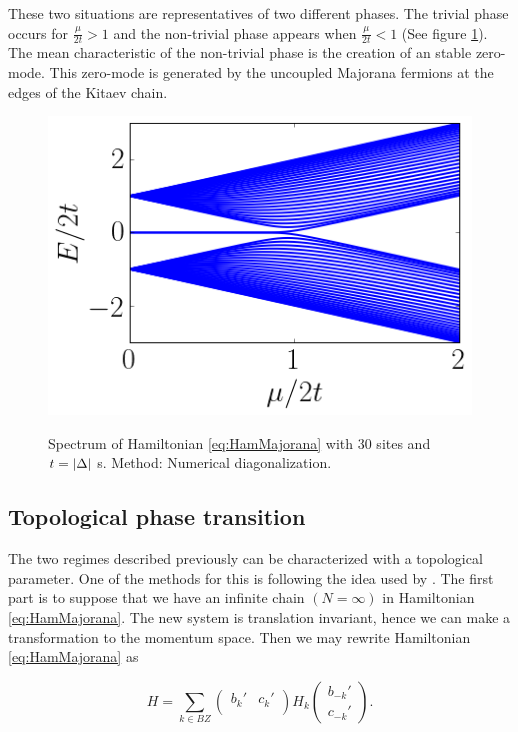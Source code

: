 These two situations are representatives of two different phases. The trivial phase occurs for $\frac{\mu}{2t}>1$ and the non-trivial phase appears when $\frac{\mu}{2t}<1$ (See figure \ref{fig:KitaevSpec}). The mean characteristic of the non-trivial phase is the creation of an stable zero-mode. This zero-mode is generated by the  uncoupled Majorana fermions at the edges of the Kitaev chain.  \\



\begin{figure}[t]
    \centering
    \includegraphics[scale=0.65]{IMAGES/Majorana/Spectrum.png}
    \label{fig:KitaevSpec}
    \caption{Spectrum of Hamiltonian \eqref{eq:HamMajorana} with $30$ sites and $t=\vert \Delta \vert$ s. Method: Numerical diagonalization. \protect {} }
\end{figure}



\subsection{Topological phase transition}

The two regimes described previously  can be characterized with a topological parameter.  One of the methods for this is following the idea used by \citeauthor{alicea_new_2012}\cite{alicea_new_2012}. The first part is to suppose that we have an infinite chain $(N=\infty)$ in Hamiltonian \eqref{eq:HamMajorana}. The new system is translation invariant, hence we can make a transformation to the momentum space. Then we may rewrite Hamiltonian \eqref{eq:HamMajorana}  as

\begin{equation}
    H = 
    \sum_{k \in BZ} 
    \begin{pmatrix} 
      b_k'  & c_{k}'\\  
    \end{pmatrix}
    H_k 
    \begin{pmatrix} 
      b_{-k}'     \\ 
      c_{-k}' 
    \end{pmatrix}.
    \label{PBCHam2}
\end{equation}

